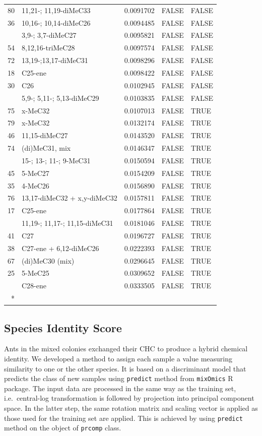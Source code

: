\documentclass[
]{article}
\begin{document}
\begin{longtable}[t]{rlrll}
80 & 11,21-; 11,19-diMeC33 & 0.0091702 & FALSE & FALSE\\
36 & 10,16-; 10,14-diMeC26 & 0.0094485 & FALSE & FALSE\\
\addlinespace
52 & 3,9-; 3,7-diMeC27 & 0.0095821 & FALSE & FALSE\\
54 & 8,12,16-triMeC28 & 0.0097574 & FALSE & FALSE\\
72 & 13,19-;13,17-diMeC31 & 0.0098296 & FALSE & FALSE\\
18 & C25-ene & 0.0098422 & FALSE & FALSE\\
30 & C26 & 0.0102945 & FALSE & FALSE\\
\addlinespace
62 & 5,9-; 5,11-; 5,13-diMeC29 & 0.0103835 & FALSE & FALSE\\
75 & x-MeC32 & 0.0107013 & FALSE & TRUE\\
79 & x-MeC32 & 0.0132174 & FALSE & TRUE\\
46 & 11,15-diMeC27 & 0.0143520 & FALSE & TRUE\\
74 & (di)MeC31, mix & 0.0146347 & FALSE & TRUE\\
\addlinespace
70 & 15-; 13-; 11-; 9-MeC31 & 0.0150594 & FALSE & TRUE\\
45 & 5-MeC27 & 0.0154209 & FALSE & TRUE\\
35 & 4-MeC26 & 0.0156890 & FALSE & TRUE\\
76 & 13,17-diMeC32 + x,y-diMeC32 & 0.0157811 & FALSE & TRUE\\
17 & C25-ene & 0.0177864 & FALSE & TRUE\\
\addlinespace
71 & 11,19-; 11,17-; 11,15-diMeC31 & 0.0181046 & FALSE & TRUE\\
41 & C27 & 0.0196727 & FALSE & TRUE\\
38 & C27-ene + 6,12-diMeC26 & 0.0222393 & FALSE & TRUE\\
67 & (di)MeC30 (mix) & 0.0296645 & FALSE & TRUE\\
25 & 5-MeC25 & 0.0309652 & FALSE & TRUE\\
\addlinespace
50 & C28-ene & 0.0333505 & FALSE & TRUE\\*
\end{longtable}

\subsection{Species Identity Score}\label{species-identity-score}

Ants in the mixed colonies exchanged their CHC to produce a hybrid chemical identity. We developed a method to assign each sample a value measuring similarity to one or the other species. It is based on a discriminant model that predicts the class of new samples using \texttt{predict} method from \texttt{mixOmics} R package. The input data are processed in the same way as the training set, i.e.~central-log transformation is followed by projection into principal component space. In the latter step, the same rotation matrix and scaling vector is applied as those used for the training set are applied. This is achieved by using \texttt{predict} method on the object of \texttt{prcomp} class.
\end{document}
